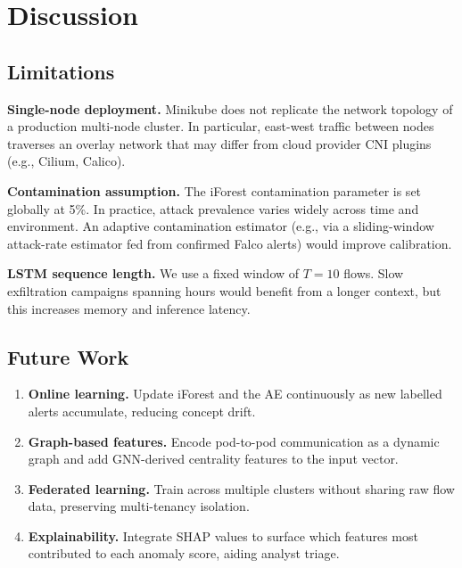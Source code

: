 \section{Discussion}
\label{sec:discussion}

\subsection{Limitations}

\textbf{Single-node deployment.}
Minikube does not replicate the network topology of a production multi-node
cluster.
In particular, east-west traffic between nodes traverses an overlay network
that may differ from cloud provider CNI plugins (e.g., Cilium, Calico).

\textbf{Contamination assumption.}
The iForest contamination parameter is set globally at 5\%.
In practice, attack prevalence varies widely across time and environment.
An adaptive contamination estimator (e.g., via a sliding-window attack-rate
estimator fed from confirmed Falco alerts) would improve calibration.

\textbf{LSTM sequence length.}
We use a fixed window of $T = 10$ flows.
Slow exfiltration campaigns spanning hours would benefit from a longer
context, but this increases memory and inference latency.

\subsection{Future Work}

\begin{enumerate}
  \item \textbf{Online learning.} Update iForest and the AE continuously
        as new labelled alerts accumulate, reducing concept drift.
  \item \textbf{Graph-based features.} Encode pod-to-pod communication
        as a dynamic graph and add GNN-derived centrality features to the
        input vector.
  \item \textbf{Federated learning.} Train across multiple clusters without
        sharing raw flow data, preserving multi-tenancy isolation.
  \item \textbf{Explainability.} Integrate SHAP values to surface which
        features most contributed to each anomaly score, aiding analyst
        triage.
\end{enumerate}
